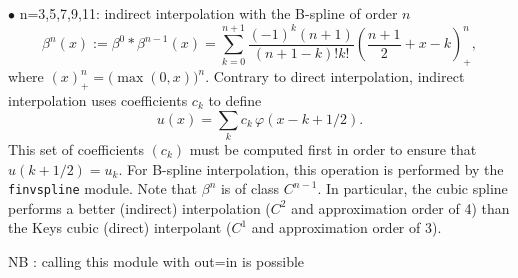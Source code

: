 \smallskip

$\bullet$ n=3,5,7,9,11: indirect interpolation 
with the B-spline of order $n$
$$\beta^n(x) := \beta^0*\beta^{n-1}(x) =
\sum_{k=0}^{n+1}\frac{(-1)^k(n+1)}{(n+1-k)!k!}
\left(\frac{n+1}2+x-k\right)^n_+,$$
where $(x)^n_+ = \big(\max(0,x)\big)^n$.
Contrary to direct interpolation, 
indirect interpolation uses coefficients $c_k$ to define
$$u(x) = \sum_k c_k \,\varphi(x-k+1/2).$$
This set of coefficients $(c_k)$ must be computed first in order
to ensure that $u(k+1/2)=u_k$. For B-spline interpolation, this
operation is performed by the \verb+finvspline+ module.
Note that $\beta^n$ is of class $C^{n-1}$. In particular, the
cubic spline performs a better (indirect) interpolation ($C^2$ and
approximation order of 4) than the Keys cubic (direct) interpolant 
($C^1$ and approximation order of 3).

\medskip

NB : calling this module with out=in is possible

